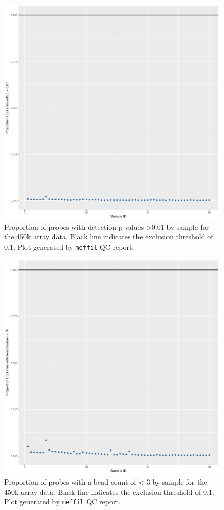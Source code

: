 \documentclass[
]{book}
\begin{document}
\begin{figure}

{\centering \includegraphics[width=0.8\linewidth]{figs/MAVIDOSqc450kpropSites} 

}

\caption{Proportion of probes with detection p-values \textgreater0.01 by sample for the 450k array data. Black line indicates the exclusion threshold of 0.1. Plot generated by \texttt{meffil} QC report.}\label{fig:MAVIDOSqc450kpropSites}
\end{figure}



\begin{figure}

{\centering \includegraphics[width=0.8\linewidth]{figs/MAVIDOSqc450kbeadNum} 

}

\caption{Proportion of probes with a bead count of \textless{} 3 by sample for the 450k array data. Black line indicates the exclusion threshold of 0.1. Plot generated by \texttt{meffil} QC report.}\label{fig:MAVIDOSqc450kbeadNum}
\end{figure}
\end{document}

